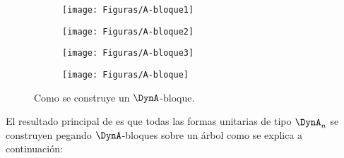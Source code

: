 \begin{figure}[H]
    \begin{subfigure}[b]{0.5\textwidth}
        \begin{minipage}{7cm}
        \centering%
         \texttt{[image: Figuras/A-bloque1]}
        \end{minipage}
    \end{subfigure}
    \begin{subfigure}[b]{0.5\textwidth}
        \begin{minipage}{7cm}
        \centering%
         \texttt{[image: Figuras/A-bloque2]}
        \end{minipage}
    \end{subfigure}
    \begin{subfigure}[b]{0.5\textwidth}
        \begin{minipage}{7cm}
        \centering%
         \texttt{[image: Figuras/A-bloque3]}
        \end{minipage}
    \end{subfigure}
    \begin{subfigure}[b]{0.5\textwidth}
        \begin{minipage}{7cm}
        \centering%
         \texttt{[image: Figuras/A-bloque]}
        \end{minipage}
    \end{subfigure}
    \caption{Como se construye un $\DynA$-bloque.}
    \label{figura:2.3}
\end{figure}
El resultado principal de \citep{Barot1999ACO} es que todas las formas unitarias de tipo $\DynA_{n}$ se construyen pegando $\DynA$-bloques sobre un árbol como se explica a continuación:
